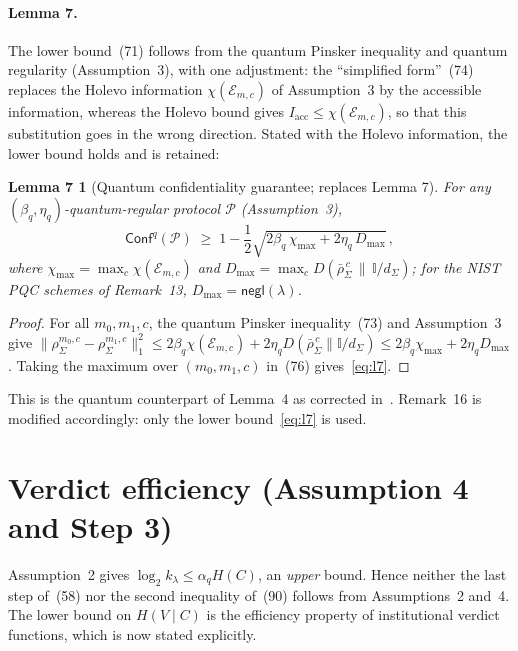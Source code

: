 \documentclass[10pt,a4paper]{article}
\newtheorem*{lemmaSeven}{Lemma 7}
\theoremstyle{remark}
\newcommand{\Confq}{\mathsf{Conf}^q}
\newcommand{\negl}{\mathsf{negl}}
\newcommand{\cP}{\mathcal{P}}
\begin{document}
\paragraph{Lemma 7.} The lower bound~(71) follows from the quantum Pinsker
inequality and quantum regularity (Assumption~3), with one adjustment: the
``simplified form''~(74) replaces the Holevo information
$\chi(\mathcal E_{m,c})$ of Assumption~3 by the accessible information,
whereas the Holevo bound gives $I_{\mathrm{acc}}\le\chi(\mathcal E_{m,c})$,
so that this substitution goes in the wrong direction. Stated with the
Holevo information, the lower bound holds and is retained:

\begin{lemmaSeven}[Quantum confidentiality guarantee; replaces Lemma 7]
For any $(\beta_q,\eta_q)$-quantum-regular protocol $\cP$ (Assumption~3),
\begin{equation*}\tag{71$'$}\label{eq:l7}
\Confq(\cP)\;\ge\;1-\frac12\sqrt{2\beta_q\,\chi_{\max}+2\eta_q\,D_{\max}}\,,
\end{equation*}
where $\chi_{\max}=\max_{c}\chi(\mathcal E_{m,c})$ and
$D_{\max}=\max_{c}D(\bar\rho^{\,c}_\Sigma\,\|\,\mathbb I/d_\Sigma)$; for the
NIST PQC schemes of Remark~13, $D_{\max}=\negl(\lambda)$.
\end{lemmaSeven}

\begin{proof}
For all $m_0,m_1,c$, the quantum Pinsker inequality~(73) and Assumption~3 give
$\|\rho^{m_0,c}_\Sigma-\rho^{m_1,c}_\Sigma\|_1^2\le
2\beta_q\chi(\mathcal E_{m,c})+2\eta_qD(\bar\rho^{\,c}_\Sigma\|\mathbb I/d_\Sigma)
\le 2\beta_q\chi_{\max}+2\eta_qD_{\max}$.
Taking the maximum over $(m_0,m_1,c)$ in~(76) gives~\eqref{eq:l7}.
\end{proof}

\noindent This is the quantum counterpart of Lemma~4 as corrected
in~\cite{cor1}. Remark~16 is modified accordingly: only the lower
bound~\eqref{eq:l7} is used.

\section{Verdict efficiency (Assumption 4 and Step 3)}

Assumption~2 gives $\log_2 k_\lambda\le\alpha_q H(C)$, an \emph{upper}
bound. Hence neither the last step of~(58) nor the second inequality
of~(90) follows from Assumptions~2 and~4. The lower bound on $H(V\mid C)$
is the efficiency property of institutional verdict functions, which is now
stated explicitly.
\end{document}
